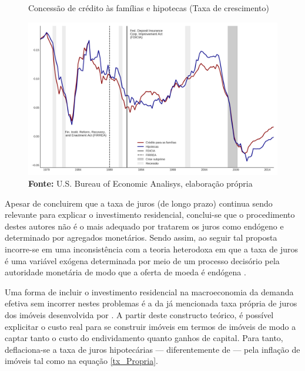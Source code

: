 \begin{figure}[htb]
	\centering
	\caption{Concessão de crédito às famílias e hipotecas (Taxa de crescimento)}
	\label{FigCreditoFDICIA}
	\includegraphics[width=\textwidth]{../../Dados/Fatos_Estilizados/figs/FDICIA.png}
	\caption*{\textbf{Fonte:} U.S. Bureau of Economic Analisys, elaboração própria}
\end{figure}
	
Apesar de \textcite{gauger_residential_2003} concluirem que a taxa de juros (de longo prazo) continua sendo relevante para explicar o investimento residencial, conclui-se que o procedimento destes autores não é o mais adequado por tratarem os juros como endógeno e determinado por agregados monetários. Sendo assim, ao seguir tal proposta incorre-se em uma inconsistência com a teoria heterodoxa em que a taxa de juros é uma variável exógena determinada por meio de um processo decisório pela autoridade monetária de modo que a oferta de moeda é endógena \cite[p.~230--256]{lavoie_post-keynesian_2015}.

Uma forma de incluir o investimento residencial na macroeconomia da demanda efetiva sem incorrer nestes problemas é a da já mencionada taxa própria de juros dos imóveis desenvolvida por \textcite{teixeira_crescimento_2015}. A partir deste constructo teórico, é possível explicitar o custo real para se construir imóveis em termos de imóveis de modo a captar tanto o custo do endividamento quanto ganhos de capital.
Para tanto, deflaciona-se a taxa de juros hipotecárias --- diferentemente de \textcite[p.~143--146]{fair_macroeconometric_2013} --- pela inflação de imóveis tal como na equação \ref{tx_Propria}.


